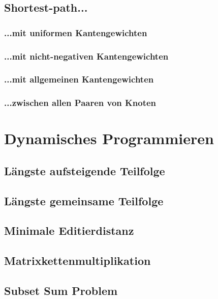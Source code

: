 \documentclass[a4paper]{article}
\begin{document}
\subsection{Shortest-path...}
    
\subsubsection{...mit uniformen Kantengewichten}
    
\subsubsection{...mit nicht-negativen Kantengewichten}
    
\subsubsection{...mit allgemeinen Kantengewichten}
    
\subsubsection{...zwischen allen Paaren von Knoten}
    
    
\section{Dynamisches Programmieren}

\subsection{Längste aufsteigende Teilfolge}

\subsection{Längste gemeinsame Teilfolge}

\subsection{Minimale Editierdistanz}

\subsection{Matrixkettenmultiplikation}

\subsection{Subset Sum Problem}
\end{document}
